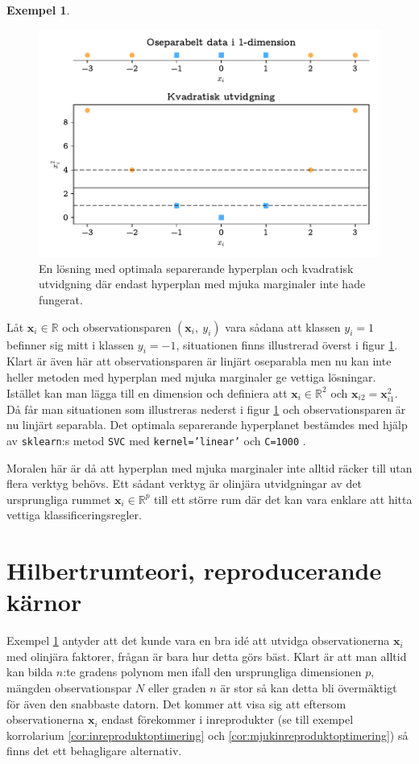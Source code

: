 \documentclass[a4paper, 12pt]{report}
\theoremstyle{definition}
\newtheorem{ex}{Exempel}[section]
\theoremstyle{remark}
\begin{document}
\begin{ex}\label{ex:olinjär}
\begin{figure}[h]
	\centering
	\includegraphics[width=0.8\linewidth, trim={0.5cm 4mm -5mm 4mm}, clip]{KandFigur3.pdf}
	\caption{\label{fig:kvadratisk}En lösning med optimala separerande hyperplan och kvadratisk utvidgning där endast hyperplan med mjuka marginaler inte hade fungerat.}
\end{figure}
Låt $\mathbf{x}_i\in\mathbb{R}$ och observationsparen $\left(\mathbf{x}_i,~y_i\right)$ vara sådana att klassen $y_i=1$ befinner sig mitt i klassen $y_i=-1$, situationen finns illustrerad överst i figur \ref{fig:kvadratisk}. Klart är även här att observationsparen är linjärt oseparabla men nu kan inte heller metoden med hyperplan med mjuka marginaler ge vettiga lösningar. Istället kan man lägga till en dimension och definiera att $\mathbf{x}_i\in\mathbb{R}^2$ och $\mathbf{x}_{i2} = \mathbf{x}_{i1}^2$.
Då får man situationen som illustreras nederst i figur \ref{fig:kvadratisk} och observationsparen är nu linjärt separabla. Det optimala separerande hyperplanet bestämdes med hjälp av \texttt{sklearn}:s metod \texttt{SVC} med \texttt{kernel='linear'} och \texttt{C=1000} \cite{sklearn}.

Moralen här är då att hyperplan med mjuka marginaler inte alltid räcker till utan flera verktyg behövs. Ett sådant verktyg är olinjära utvidgningar av det ursprungliga rummet $\mathbf{x}_i\in \mathbb{R}^p$ till ett större rum där det kan vara enklare att hitta vettiga klassificeringsregler.
\end{ex}
\chapter{Hilbertrumteori, reproducerande kärnor}\label{chap:hilbert}
Exempel \ref{ex:olinjär} antyder att det kunde vara en bra idé att utvidga observationerna $\mathbf{x}_i$ med olinjära faktorer, frågan är bara hur detta görs bäst. Klart är att man alltid kan bilda $n$:te gradens polynom men ifall den ursprungliga dimensionen $p$, mängden observationspar $N$ eller graden $n$ är stor så kan detta bli övermäktigt för även den snabbaste datorn. Det kommer att visa sig att eftersom observationerna $\mathbf{x}_i$ endast förekommer i inreprodukter (se till exempel korrolarium \ref{cor:inreproduktoptimering} och \ref{cor:mjukinreproduktoptimering}) så finns det ett behagligare alternativ.
\end{document}
